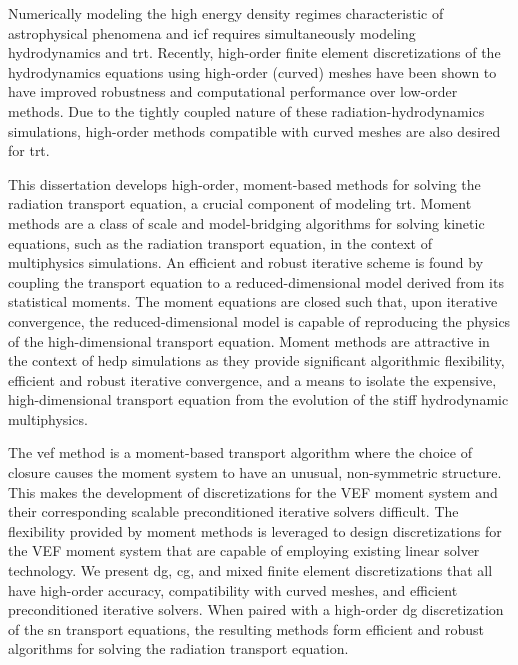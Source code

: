 \documentclass[../doc.tex]{subfiles}
\begin{document}
Numerically modeling the high energy density regimes characteristic of astrophysical phenomena and \gls{icf} requires simultaneously modeling hydrodynamics and \gls{trt}. 
Recently, high-order finite element discretizations of the hydrodynamics equations using high-order (curved) meshes have been shown to have improved robustness and computational performance over low-order methods. Due to the tightly coupled nature of these radiation-hydrodynamics simulations, high-order methods compatible with curved meshes are also desired for \gls{trt}. 

This dissertation develops high-order, moment-based methods for solving the radiation transport equation, a crucial component of modeling \gls{trt}.  
Moment methods are a class of scale and model-bridging algorithms for solving kinetic equations, such as the radiation transport equation, in the context of multiphysics simulations. An efficient and robust iterative scheme is found by coupling the transport equation to a reduced-dimensional model derived from its statistical moments. The moment equations are closed such that, upon iterative convergence, the reduced-dimensional model is capable of reproducing the physics of the high-dimensional transport equation. 
Moment methods are attractive in the context of \gls{hedp} simulations as they provide significant algorithmic flexibility, efficient and robust iterative convergence, and a means to isolate the expensive, high-dimensional transport equation from the evolution of the stiff hydrodynamic multiphysics. 

The \gls{vef} method is a moment-based transport algorithm where the choice of closure causes the moment system to have an unusual, non-symmetric structure. This makes the development of discretizations for the VEF moment system and their corresponding scalable preconditioned iterative solvers difficult. The flexibility provided by moment methods is leveraged to design discretizations for the VEF moment system that are capable of employing existing linear solver technology. We present \gls{dg}, \gls{cg}, and mixed finite element discretizations that all have high-order accuracy, compatibility with curved meshes, and efficient preconditioned iterative solvers. When paired with a high-order \gls{dg} discretization of the \gls{sn} transport equations, the resulting methods form efficient and robust algorithms for solving the radiation transport equation. 
\end{document}
